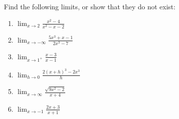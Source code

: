 Find the following limits, or show that they do not exist:
\begin{multicols}{2}
\begin{enumerate}
\item ${\displaystyle \lim_{x \to 2} \frac{x^2-4}{x^2-x-2}}$
\item ${\displaystyle \lim_{x \to -\infty} \frac{5x^3+x-1}{2x^3-7}}$
\item ${\displaystyle \lim_{x \to 1^{+}} \frac{x-3}{x-1}}$
\answer{$-\infty$}
\item ${\displaystyle \lim_{h \to 0} \frac{2(x+h)^3 - 2x^3}{h}}$
\item ${\displaystyle \lim_{x \to \infty} \frac{\sqrt{9x^2-2}}{x+4}}$
\item ${\displaystyle \lim_{x \to -1} \frac{2x+3}{x+1}}$
\end{enumerate}
\end{multicols}
